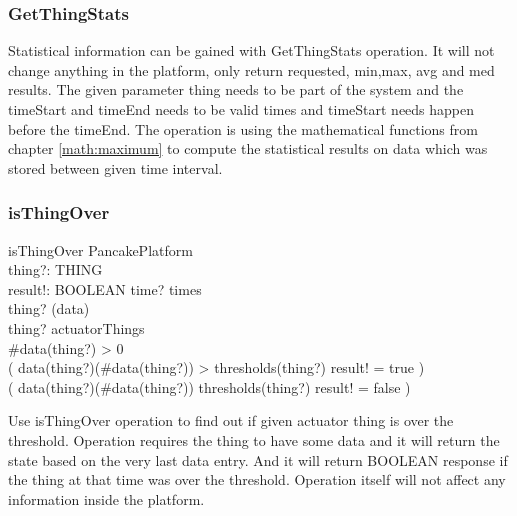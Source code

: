 \documentclass{article}
\begin{document}
\label{toc:GetThingStats}
\subsubsection{GetThingStats}
Statistical information  can be gained with GetThingStats operation. It will not change anything in the platform, only return requested, min,max, avg and med results. The given parameter thing needs to be part of the system and the timeStart and timeEnd needs to be valid times and timeStart needs happen before the timeEnd. The operation is using the mathematical functions from chapter \ref{math:maximum} to compute the statistical results on data which was stored between given time interval.


\newpage
\label{toc:isThingOver}
\subsubsection{isThingOver}
\begin{schema}{isThingOver}
  \Xi PancakePlatform \\
  thing?: THING \\
  result!: BOOLEAN 
\where
  time? \in times \\
  thing? \in \dom(data) \\  
  thing? \in actuatorThings \\
  \#data(thing?) > 0 \\
  ( data(thing?)(\#data(thing?)) > thresholds(thing?) \land result! = true ) \lor \\
  ( data(thing?)(\#data(thing?)) \leq thresholds(thing?) \land result! = false ) 
\end{schema}
Use isThingOver operation to find out if given actuator thing is over the threshold. Operation requires the thing to have some data and it will return the state based on the very last data entry. And it will return BOOLEAN response if the thing at that time was over the threshold. Operation itself will not affect any information inside the platform.
\end{document}
